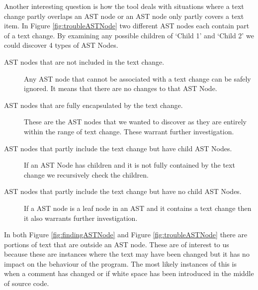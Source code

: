 Another interesting question is how the tool deals with situations where a text change partly overlaps an AST node or an AST node only partly covers a text item.  
In Figure \ref{fig:troubleASTNode} two different AST nodes each contain part of a text change. 
By examining any possible children of `Child 1' and `Child 2' we could discover 4 types of AST Nodes.
\begin{description}

  \item [AST nodes that are not included in the text change.]
    Any AST node that cannot be associated with a text change can be safely ignored. It means that there are no changes to that AST Node.
  \item [AST nodes that are fully encapsulated by the text change.] 
    These are the AST nodes that we wanted to discover as they are entirely within the range of text change.  These warrant further investigation.
  \item [AST nodes that partly include the text change but have child AST Nodes.]
    If an AST Node has children and it is not fully contained by the text change we recursively check the children.
  \item [AST nodes that partly include the text change but have no child AST Nodes.]
    If a AST node is a leaf node in an AST and it contains a text change then it also warrants further investigation.       
\end{description}

In both Figure \ref{fig:findingASTNode} and Figure \ref{fig:troubleASTNode} there are portions of text that are outside an AST node.  These are of interest to us because these are instances where the text may have been changed but it has no impact on the behaviour of the program.  The most likely instances of this is when a comment has changed or if white space has been introduced in the middle of source code.

% 
% 
% 

